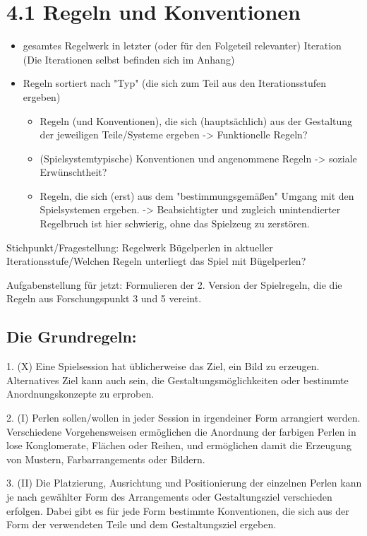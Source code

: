 \documentclass[11pt,a4paper,twoside]{scrreprt}
\begin{document}
	\section{4.1 Regeln und Konventionen}
	\begin{itemize}
		\item gesamtes Regelwerk in letzter (oder für den Folgeteil relevanter) Iteration   
  (Die Iterationen selbst befinden sich im Anhang)
		\item Regeln sortiert nach "Typ" (die sich zum Teil aus den Iterationsstufen ergeben)
		\begin{itemize}
			\item Regeln (und Konventionen), die sich (hauptsächlich) aus der Gestaltung der jeweiligen Teile/Systeme ergeben -> Funktionelle Regeln?
			\item (Spielsystemtypische) Konventionen und angenommene Regeln -> soziale Erwünschtheit?
			\item Regeln, die sich (erst) aus dem "bestimmungsgemäßen" Umgang mit den Spielsystemen ergeben. -> Beabsichtigter und zugleich unintendierter Regelbruch ist hier schwierig, ohne das Spielzeug zu zerstören.
		\end{itemize}
	\end{itemize}

Stichpunkt/Fragestellung: Regelwerk Bügelperlen in aktueller Iterationsstufe/Welchen Regeln unterliegt das Spiel mit Bügelperlen?

Aufgabenstellung für jetzt: Formulieren der 2. Version der Spielregeln, die die Regeln aus Forschungspunkt 3 und 5 vereint.

			\subsection{Die Grundregeln:}

1. (X) Eine Spielsession hat üblicherweise das Ziel, ein Bild zu erzeugen. Alternatives Ziel kann auch sein, die Gestaltungsmöglichkeiten oder bestimmte Anordnungskonzepte zu erproben.


2. (I) Perlen sollen/wollen in jeder Session in irgendeiner Form arrangiert werden. Verschiedene Vorgehensweisen ermöglichen die Anordnung der farbigen Perlen in lose Konglomerate, Flächen oder Reihen, und ermöglichen damit die Erzeugung von Mustern, Farbarrangements oder Bildern. 

3. (II) Die Platzierung, Ausrichtung und Positionierung der einzelnen Perlen kann je nach gewählter Form des Arrangements oder Gestaltungsziel verschieden erfolgen. Dabei gibt es für jede Form bestimmte Konventionen, die sich aus der Form der verwendeten Teile und dem Gestaltungsziel ergeben. 
\end{document}
